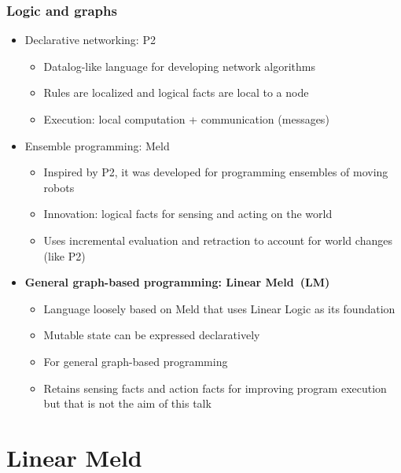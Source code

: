 \documentclass{beamer}
\begin{document}
\frame
{
   \frametitle{Logic and graphs}
   \begin{itemize}
      \item Declarative networking: P2
      \begin{itemize}
         \item Datalog-like language for developing network algorithms
         \item Rules are localized and logical facts are local to a node
         \item Execution: local computation + communication (messages)
      \end{itemize}
      \item Ensemble programming: Meld
      \begin{itemize}
         \item Inspired by P2, it was developed for programming ensembles of moving robots
         \item Innovation: logical facts for sensing and acting on the world
         \item Uses incremental evaluation and retraction to account for world changes (like P2)
      \end{itemize}
      \item \textbf{General graph-based programming: Linear Meld~(LM)}
      \begin{itemize}
         \item Language loosely based on Meld that uses Linear Logic as its foundation
         \item Mutable state can be expressed declaratively
         \item For general graph-based programming
         \item Retains sensing facts and action facts for improving program execution but that is not the aim of this talk
      \end{itemize}
   \end{itemize}
}

\section{Linear Meld}
\end{document}
